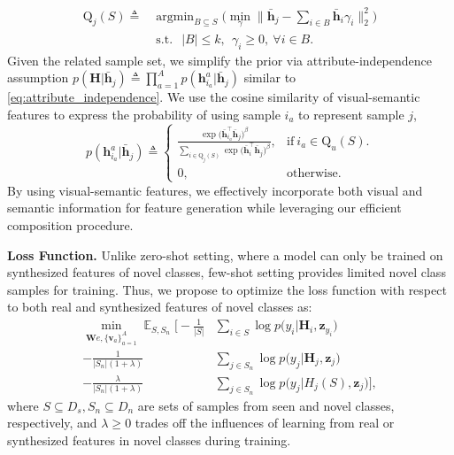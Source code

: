\documentclass[10pt,journal,compsoc]{IEEEtran}
\newcommand{\z}{\boldsymbol{z}}
\newcommand{\h}{\boldsymbol{h}}
\newcommand{\W}{\boldsymbol{W}}
\renewcommand{\v}{\boldsymbol{v}}
\renewcommand{\H}{\boldsymbol{H}}
\DeclareMathOperator{\E}{\mathbb{E}}
\newcommand{\1}{\boldsymbol{1}}
\newcommand{\0}{\boldsymbol{0}}
\newcommand{\Q}{\mathrm{Q}}
\newcommand{\argmin}{\operatorname{argmin}}
\newcommand{\<}{\langle}
\renewcommand{\>}{\rangle}
\newcommand{\myparagraph}[1]{\vspace{-2pt}\medskip\noindent\textbf{#1}}
\begin{document}
\begin{equation}
\begin{split}
\Q_j(S) \triangleq &\argmin_{B\subseteq S} \Big(\min_{\gamma}\| \bar{\h}_j -\sum_{i\in B}\bar{\h}_i \gamma_i\|^2_2 \Big)\\ 
&\operatorname{s.t.}~~ |B|\leq k,~~ \gamma_i \geq 0,~ \forall i \in B.
\end{split}
\end{equation}
Given the related sample set, we simplify the prior via attribute-independence assumption $p(\H|\bar{\h}_j) \triangleq \prod_{a=1}^{A} p(\h^a_{i_a}|\bar{\h}_j)$ similar to \eqref{eq:attribute_independence}.
We use the cosine similarity of visual-semantic features to express the probability of using sample $i_a$ to represent sample $j$,
\begin{equation}
p(\h^a_{i_a}|\bar{\h}_j)\triangleq \begin{cases}
      \frac{\exp\big(\bar{\h}_{i_a}^\top\bar{\h}_j \big)^\beta}{\sum_{i\in \Q_{j}(S)}\exp\big(\bar{\h}_{i}^\top\bar{\h}_j\big)^\beta }, & \text{if}\ i_a \in \Q_{u}(S). \\
      0, & \text{otherwise.}
    \end{cases}
\end{equation}
By using visual-semantic features, we effectively incorporate both visual and semantic information for feature generation while leveraging our efficient composition procedure.

\myparagraph{Loss Function.}
Unlike zero-shot setting, where a model can only be trained on synthesized features of novel classes, few-shot setting provides limited novel class samples for training.
Thus, we propose to optimize the loss function with respect to both real and synthesized features of novel classes as:  
\begin{equation}
\begin{split}
\min_{\W{e},\{\v_a\}^A_{a=1}} \E_{S,S_n} \Big[-\frac{1}{|S|} &\sum_{i\in S} \log p\big(y_i|\H_i,\z_{y_i} \big) \\
-\frac{1}{|S_n|(1+\lambda)} &\sum_{j\in S_n} \log p\big(y_j|\H_j,\z_j \big)\\
-\frac{\lambda}{|S_n|(1+\lambda)} &\sum_{j\in S_n} \log p\big(y_j|H_j(S),\z_j \big) \Big],
\label{eq:self-compose_fs}
\end{split}
\end{equation}
where $S \subseteq D_s, S_n \subseteq D_n$ are sets of samples from seen and novel classes, respectively, and $\lambda \geq 0$ trades off the influences of learning from real or synthesized features in novel classes during training.
\end{document}
